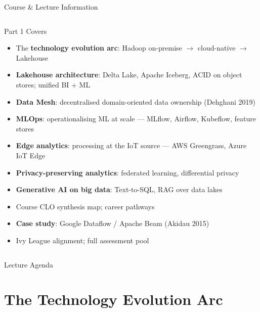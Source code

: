 \documentclass[aspectratio=169,10pt]{beamer}
\begin{document}
\begin{frame}{Course \& Lecture Information}
\begin{columns}[T]
      \begin{exampleblock}{Part 1 Covers}
        \begin{itemize}
          \item The \textbf{technology evolution arc}: Hadoop on-premise $\to$ cloud-native $\to$ Lakehouse
          \item \textbf{Lakehouse architecture}: Delta Lake, Apache Iceberg, ACID on object stores; unified BI + ML
          \item \textbf{Data Mesh}: decentralised domain-oriented data ownership (Dehghani 2019)
          \item \textbf{MLOps}: operationalising ML at scale --- MLflow, Airflow, Kubeflow, feature stores
          \item \textbf{Edge analytics}: processing at the IoT source --- AWS Greengrass, Azure IoT Edge
          \item \textbf{Privacy-preserving analytics}: federated learning, differential privacy
          \item \textbf{Generative AI on big data}: Text-to-SQL, RAG over data lakes
          \item Course CLO synthesis map; career pathways
          \item \textbf{Case study}: Google Dataflow / Apache Beam (Akidau 2015)
          \item Ivy League alignment; full assessment pool
        \end{itemize}
      \end{exampleblock}
  \end{columns}
\end{frame}

\begin{frame}{Lecture Agenda}\tableofcontents\end{frame}

\section{The Technology Evolution Arc}
\end{document}
